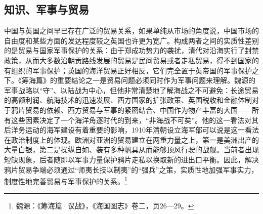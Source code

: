 \documentclass[a4paper, 12pt, openright]{ctexbook}
\begin{document}
\subsection{知识、军事与贸易}

中国与英国之间早已存在广泛的贸易关系，如果单纯从市场的角度说，中国市场的自由度和某些方面的发达程度较之英国也许更为宽广。构成两者之间的实质性差别的是贸易与国家军事保护的关系：由于郑成功势力的袭扰，清代对沿海实行了封禁政策，从而大多数沿朝贡路线发展的贸易是民间贸易或者走私贸易，得不到国家的有组织的军事保护；英国的海洋贸易正好相反，它们完全置于英帝国的军事保护之下。《筹海篇》的重要结论之一是贸易问题必须同时作为军事问题来理解。魏源的军事战略以“守”、以陆战为中心，但他非常清楚地了解海战之不可避免：长途贸易的高额利润、航海技术的迅速发展、西方国家的扩张政策、英国税收和金融体制对于鸦片贸易的依赖、西方贸易与军事的紧密结合、中国作为物产丰富的大国——所有这些因素决定了一个海洋角逐时代的到来，“非海战不可矣”。他的这一看法对其后洋务运动的海军建设有着重要的影响，1910年清朝设立海军部可以说是这一看法在政治制度上的体现。欧洲对亚洲的贸易建立在两重力量之上，第一是美洲出产的大量白银，第二是操纵自如、装有多种帆具从而能够顶风行驶的战舰。当前者出现短缺现象，后者随即以军事力量保护鸦片走私以换取新的进出口平衡。因此，解决鸦片贸易争端必须通过“师夷长技以制夷”的“强兵”之策，实质性地加强军事实力，制度性地完善贸易与军事保护的关系。\footnote{魏源：《筹海篇·议战》，《海国图志》卷二，页26—29。}
\end{document}
